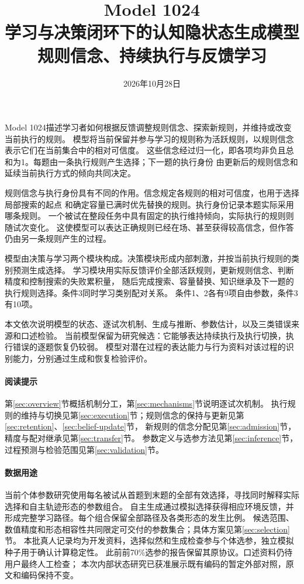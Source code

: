 \documentclass[11pt,a4paper]{article}
\title{Model 1024\\[0.5em]
\Large 学习与决策闭环下的认知隐状态生成模型\\[0.5em]
\large 规则信念、持续执行与反馈学习}
\author{}
\date{2026年10月28日}
\numberwithin{equation}{section}
\begin{document}
\maketitle
\thispagestyle{empty}


Model 1024描述学习者如何根据反馈调整规则信念、探索新规则，并维持或改变当前执行的规则。
模型将当前保留并参与学习的规则称为活跃规则，以规则信念表示它们在当前集合中的相对可信度。
这些信念经过归一化，即各项均非负且总和为1。每题由一条执行规则产生选择；下一题的执行身份
由更新后的规则信念和延续当前执行方式的倾向共同决定。

规则信念与执行身份具有不同的作用。信念规定各规则的相对可信度，也用于选择局部搜索的起点
和确定容量已满时优先替换的规则。执行身份记录本题实际采用哪条规则。
一个被试在整段任务中具有固定的执行维持倾向，实际执行的规则则随试次变化。
这使模型可以表达正确规则已经在场、甚至获得较高信念，但作答仍由另一条规则产生的过程。

模型由决策与学习两个模块构成。决策模块形成内部刺激，并按当前执行规则的类别预测生成选择。
学习模块用实际反馈评价全部活跃规则，更新规则信念、判断精度和控制搜索的失败累积量，
随后完成搜索、容量替换、知识继承及下一题的执行规则选择。条件3同时学习类别配对关系。
条件1、2各有9项自由参数，条件3有10项。

本文依次说明模型的状态、逐试次机制、生成与推断、参数估计，以及三类错误来源和口述检验。
当前模型保留为研究候选：它能够表达持续执行及执行切换，执行错误的逐题恢复仍较弱。
模型对潜在过程的表达能力与行为资料对该过程的识别能力，分别通过生成和恢复检验评价。

\paragraph{阅读提示}
第\ref{sec:overview}节概括机制分工，第\ref{sec:mechanisms}节说明逐试次机制。
执行规则的维持与切换见第\ref{sec:execution}节；规则信念的保持与更新见第\ref{sec:retention}、\ref{sec:belief-update}节，
新规则的信念分配见第\ref{sec:admission}节，精度与配对继承见第\ref{sec:transfer}节。
参数定义与选参方法见第\ref{sec:inference}节，过程预测与检验范围见第\ref{sec:validation}节。

\paragraph{数据用途}
当前个体参数研究使用每名被试从首题到末题的全部有效选择，寻找同时解释实际选择和自主轨迹形态的参数组合。
自主生成通过模拟选择获得相应环境反馈，并形成完整学习路径。每个组合保留全部路径及各类形态的发生比例。
候选范围、数值精度和形态相容性共同限定可交付的参数集合；具体方案见第\ref{sec:selection}节。
本批真人记录均为开发资料，选择似然和生成检查参与个体选参，独立模拟种子用于确认计算稳定性。
此前前70\%选参的报告保留其原协议。口述资料仍待用户最终人工检查；
本次内部状态研究已获准展示既有编码的暂定外部对照，原文和编码保持不变。
\end{document}
